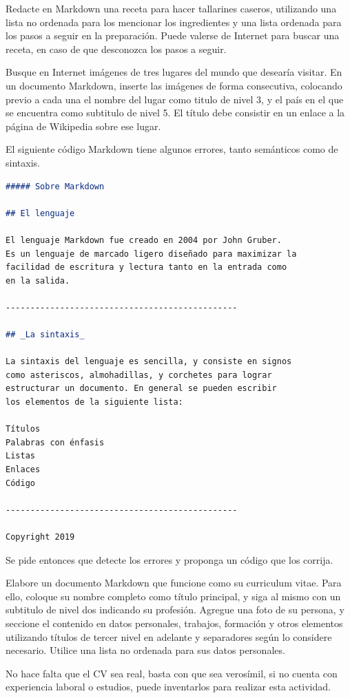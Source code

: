 \begin{exercise}
Redacte en Markdown una receta para hacer tallarines caseros, utilizando una
lista no ordenada para los mencionar los ingredientes y una lista ordenada para
los pasos a seguir en la preparación. Puede valerse de Internet para buscar una
receta, en caso de que desconozca los pasos a seguir.
\end{exercise}

\begin{exercise}
Busque en Internet imágenes de tres lugares del mundo que desearía visitar.
En un documento Markdown, inserte las imágenes de forma consecutiva, colocando
previo a cada una el nombre del lugar como titulo de nivel 3, y el país en el
que se encuentra como subtitulo de nivel 5. El título debe consistir en un enlace
a la página de Wikipedia sobre ese lugar.
\end{exercise}

\begin{exercise}
El siguiente código Markdown tiene algunos errores, tanto semánticos como de
sintaxis.

\begin{minipage}{0.92\textwidth}
\begin{lstlisting}[language=Markdown]
##### Sobre Markdown

## El lenguaje

El lenguaje Markdown fue creado en 2004 por John Gruber.
Es un lenguaje de marcado ligero diseñado para maximizar la
facilidad de escritura y lectura tanto en la entrada como
en la salida.

-----------------------------------------------

## _La sintaxis_

La sintaxis del lenguaje es sencilla, y consiste en signos
como asteriscos, almohadillas, y corchetes para lograr
estructurar un documento. En general se pueden escribir
los elementos de la siguiente lista:

Títulos
Palabras con énfasis
Listas
Enlaces
Código

-----------------------------------------------

Copyright 2019
\end{lstlisting}
\end{minipage}

Se pide entonces que detecte los errores y proponga un código que los corrija.
\end{exercise}

\begin{exercise}
Elabore un documento Markdown que funcione como su curriculum vitae.
Para ello, coloque su nombre completo como título principal, y siga al mismo
con un subtitulo de nivel dos indicando su profesión. Agregue una foto de su persona,
y seccione el contenido en datos personales, trabajos, formación y otros elementos
utilizando títulos de tercer nivel en adelante y separadores según lo considere
necesario. Utilice una lista no ordenada para sus datos personales.

No hace falta que el CV sea real, basta con que sea verosímil, si no cuenta con
experiencia laboral o estudios, puede inventarlos para realizar esta actividad.
\end{exercise}

